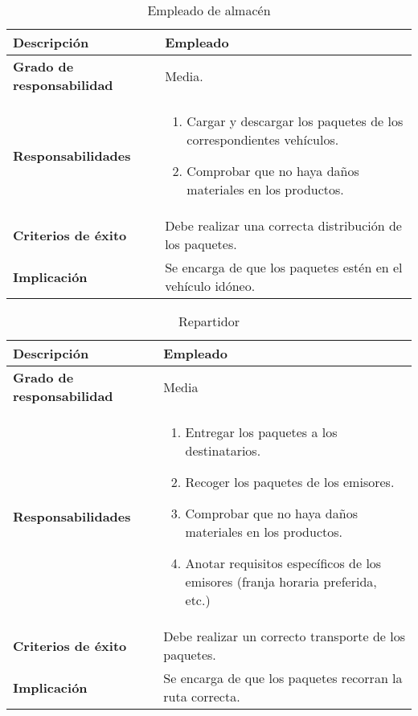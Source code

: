 \documentclass[12pt,spanish]{article}
\begin{document}

\begin{table}[H]
\begin{center}
\begin{tabular}{|l|p{10cm}|}
\hline
\textbf{Descripción} & Empleado \\
\hline
\textbf{Grado de responsabilidad} & Media. \\
\hline
\textbf{Responsabilidades} & 
\begin{minipage}{10cm}
    \vskip 1pt
    \begin{enumerate}
   		\item Cargar y descargar los paquetes de los correspondientes vehículos.
   		\item Comprobar que no haya daños materiales en los productos.
   \end{enumerate}
   \vskip 1pt
 \end{minipage}\\ 
\hline
\textbf{Criterios de éxito} & Debe realizar una correcta distribución de los paquetes.\\
\hline
\textbf{Implicación} & Se encarga de que los paquetes estén en el vehículo idóneo. \\
\hline
\end{tabular}
\caption{Empleado de almacén}
\end{center}
\end{table}

\begin{table}[H]
\begin{center}
\begin{tabular}{|l|m{10cm}|}
\hline
\textbf{Descripción} & Empleado \\
\hline
\textbf{Grado de responsabilidad} & Media \\
\hline
\textbf{Responsabilidades} & 
\begin{minipage}{10cm}
    \vskip 1pt
    \begin{enumerate}
   		\item Entregar los paquetes a los destinatarios.
   		\item Recoger los paquetes de los emisores.
   		\item Comprobar que no haya daños materiales en los productos.
   		\item Anotar requisitos específicos de los emisores (franja horaria preferida, etc.)
   \end{enumerate}
   \vskip 1pt
 \end{minipage}\\ 
\hline
\textbf{Criterios de éxito} & Debe realizar un correcto transporte de los paquetes.\\
\hline
\textbf{Implicación} & Se encarga de que los paquetes recorran la ruta correcta. \\
\hline
\end{tabular}
\caption{Repartidor}
\end{center}
\end{table}
\end{document}
